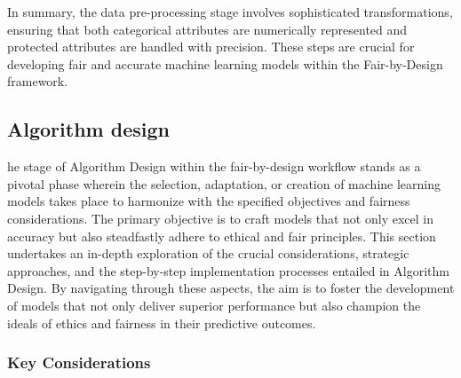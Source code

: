 In summary, the data pre-processing stage involves sophisticated transformations, ensuring that both categorical attributes are numerically represented and protected attributes are handled with precision. These steps are crucial for developing fair and accurate machine learning models within the Fair-by-Design framework.

\subsection{Algorithm design}
\label{subsection:algorithm}

he stage of Algorithm Design within the fair-by-design workflow stands as a pivotal phase wherein the selection, adaptation, or creation of machine learning models takes place to harmonize with the specified objectives and fairness considerations. The primary objective is to craft models that not only excel in accuracy but also steadfastly adhere to ethical and fair principles. This section undertakes an in-depth exploration of the crucial considerations, strategic approaches, and the step-by-step implementation processes entailed in Algorithm Design. By navigating through these aspects, the aim is to foster the development of models that not only deliver superior performance but also champion the ideals of ethics and fairness in their predictive outcomes.

\subsubsection{Key Considerations}

